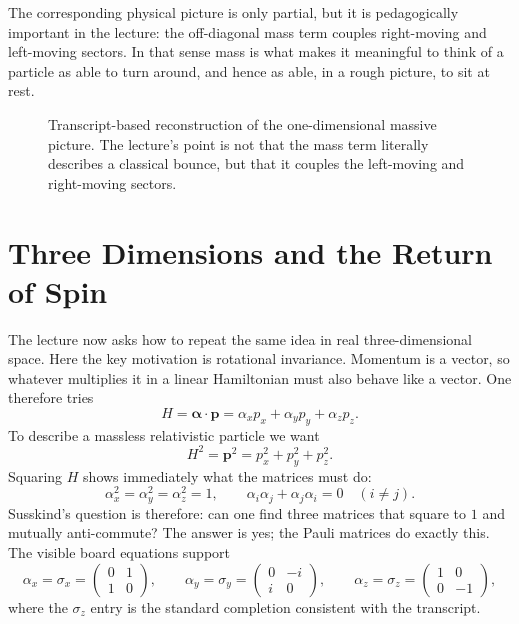 The corresponding physical picture is only partial, but it is pedagogically important in the lecture: the off-diagonal mass term couples right-moving and left-moving sectors. In that sense mass is what makes it meaningful to think of a particle as able to turn around, and hence as able, in a rough picture, to sit at rest.

\begin{figure}[ht]
\centering
{}
\caption{Transcript-based reconstruction of the one-dimensional massive picture. The lecture's point is not that the mass term literally describes a classical bounce, but that it couples the left-moving and right-moving sectors.}
\label{fig:aqm10-left-right-mixing}
\end{figure}

\section{Three Dimensions and the Return of Spin}

The lecture now asks how to repeat the same idea in real three-dimensional space. Here the key motivation is rotational invariance. Momentum is a vector, so whatever multiplies it in a linear Hamiltonian must also behave like a vector. One therefore tries
\begin{equation}
H=\boldsymbol{\alpha}\cdot\mathbf p
=
\alpha_x p_x+\alpha_y p_y+\alpha_z p_z.
\end{equation}
To describe a massless relativistic particle we want
\begin{equation}
H^2=\mathbf p^2=p_x^2+p_y^2+p_z^2.
\end{equation}
Squaring \(H\) shows immediately what the matrices must do:
\begin{equation}
\alpha_x^2=\alpha_y^2=\alpha_z^2=1,
\qquad
\alpha_i\alpha_j+\alpha_j\alpha_i=0
\quad
(i\neq j).
\end{equation}
Susskind's question is therefore: can one find three matrices that square to \(1\) and mutually anti-commute? The answer is yes; the Pauli matrices do exactly this. The visible board equations support
\begin{equation}
\alpha_x=\sigma_x=
\begin{pmatrix}
0&1\\
1&0
\end{pmatrix},
\qquad
\alpha_y=\sigma_y=
\begin{pmatrix}
0&-i\\
i&0
\end{pmatrix},
\qquad
\alpha_z=\sigma_z=
\begin{pmatrix}
1&0\\
0&-1
\end{pmatrix},
\end{equation}
where the \(\sigma_z\) entry is the standard completion consistent with the transcript.

